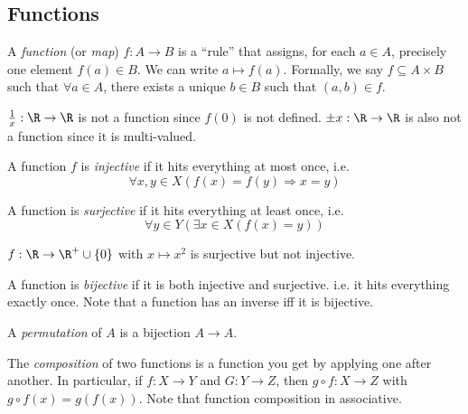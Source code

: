 \documentclass[a4paper]{article}
\begin{document}
  \subsection{Functions}
  \begin{defi}
    A \emph{function} (or \emph{map}) $f: A\to B$ is a ``rule'' that assigns, for each $a\in A$, precisely one element $f(a)\in B$. We can write $a\mapsto f(a)$. Formally, we say $f\subseteq A\times B$ such that $\forall a\in A$, there exists a unique $b\in B$ such that $(a, b)\in f$.
  \end{defi}

  \begin{eg}
    $\frac{1}{x}:\R\to\R$ is not a function since $f(0)$ is not defined. $\pm x: \R\to\R$ is also not a function since it is multi-valued.
  \end{eg}

  \begin{defi}
    A function $f$ is \emph{injective} if it hits everything at most once, i.e.
    \[
      \forall x, y\in X(f(x) = f(y)\Rightarrow x = y)
    \]
  \end{defi}

  \begin{defi}
    A function is \emph{surjective} if it hits everything at least once, i.e. 
    \[
      \forall y\in Y(\exists x\in X(f(x) = y))
    \]
  \end{defi}

  \begin{eg}
    $f: \R \to\R^+\cup\{0\}$ with $x \mapsto x^2$ is surjective but not injective.
  \end{eg}

  \begin{defi}
    A function is \emph{bijective} if it is both injective and surjective. i.e. it hits everything exactly once. Note that a function has an inverse iff it is bijective.
  \end{defi}

  \begin{defi}
    A \emph{permutation} of $A$ is a bijection $A\to A$.
  \end{defi}

  \begin{defi}
    The \emph{composition} of two functions is a function you get by applying one after another. In particular, if $f: X \rightarrow Y$ and $G: Y\rightarrow Z$, then $g\circ f: X \rightarrow Z$ with $g\circ f(x) = g(f(x))$. Note that function composition in associative.
  \end{defi}
\end{document}
